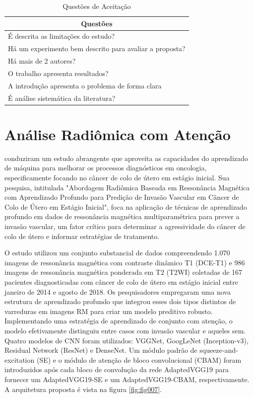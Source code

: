 \begin{table}[hbtp]
    \centering
    \renewcommand{\arraystretch}{1.4} %
    \begin{tabular}{|l|}
    \hline 
          \multicolumn{1}{|c|}{\textbf{Questões}} \\ 
    \hline 
        \quad É descrita as limitações do estudo? \\
        \quad Há um experimento bem descrito para avaliar a proposta? \\
        \quad Há mais de 2 autores? \\
        \quad O trabalho apresenta resultados? \\
        \quad A introdução apresenta o problema de forma clara \\
        \quad É análise sistemática da literatura? \\
    \hline 
    \end{tabular} 
    \caption{Questões de Aceitação}
    \label{tab:questoes}
\end{table}

\section{Análise Radiômica com Atenção}
\label{sec:analise_radiomica}

 \citeauthor{jiangMRIBasedRadiomics2021} \citeyear{jiangMRIBasedRadiomics2021} conduziram um estudo abrangente que aproveita as capacidades do aprendizado de máquina para melhorar os processos diagnósticos em oncologia, especificamente focando no câncer de colo de útero em estágio inicial. Sua pesquisa, intitulada "Abordagem Radiômica Baseada em Ressonância Magnética com Aprendizado Profundo para Predição de Invasão Vascular em Câncer de Colo de Útero em Estágio Inicial", foca na aplicação de técnicas de aprendizado profundo em dados de ressonância magnética multiparamétrica para prever a invasão vascular, um fator crítico para determinar a agressividade do câncer de colo de útero e informar estratégias de tratamento.

O estudo utilizou um conjunto substancial de dados compreendendo 1.070 imagens de ressonância magnética com contraste dinâmico T1 (DCE-T1) e 986 imagens de ressonância magnética ponderada em T2 (T2WI) coletadas de 167 pacientes diagnosticadas com câncer de colo de útero em estágio inicial entre janeiro de 2014 e agosto de 2018. Os pesquisadores empregaram uma nova estrutura de aprendizado profundo que integrou esses dois tipos distintos de varreduras em imagens RM para criar um modelo preditivo robusto. Implementando uma estratégia de aprendizado de conjunto com atenção, o modelo efetivamente distinguiu entre casos com invasão vascular e aqueles sem. Quatro modelos de CNN foram utilizados: VGGNet, GoogLeNet (Inception-v3), Residual Network (ResNet) e DenseNet. Um módulo padrão de squeeze-and-excitation (SE)  e o módulo de atenção de bloco convolucional (CBAM)  foram introduzidos após cada bloco de convolução da rede AdaptedVGG19 para fornecer um AdaptedVGG19-SE e um AdaptedVGG19-CBAM, respectivamente. A arquitetura proposta é vista na figura \ref{fig:fig007}.

